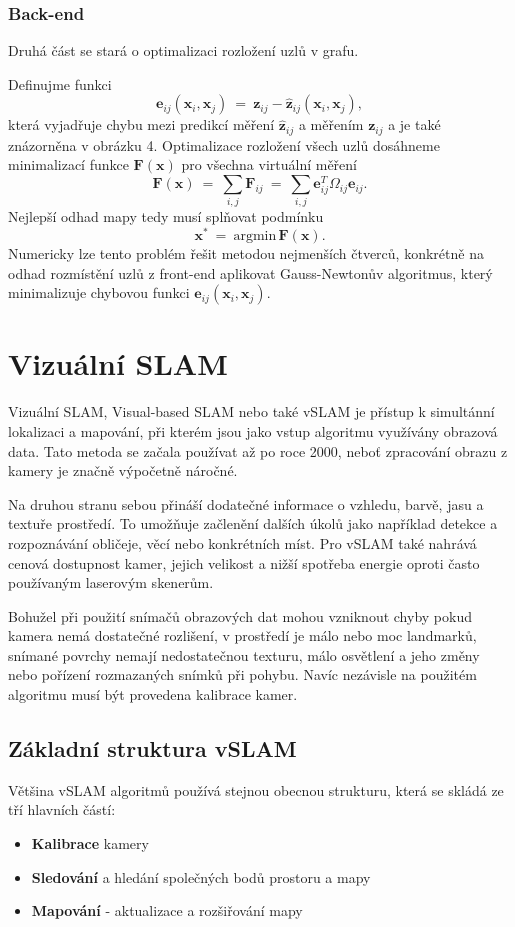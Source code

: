 \documentclass[12pt,a4paper]{article}
\begin{document}
\subsubsection{Back-end}
Druhá část se stará o optimalizaci rozložení uzlů v grafu.

Definujme funkci 
$$
\textbf{e}_{ij}(\textbf{x}_i, \textbf{x}_j) \: = \: \textbf{z}_{ij}-\hat{\textbf{z}}_{ij}(\textbf{x}_i, \textbf{x}_j),
$$
která vyjadřuje chybu mezi predikcí měření $\hat{\textbf{z}}_{ij}$ a měřením $\textbf{z}_{ij}$ a je také znázorněna v obrázku 4. Optimalizace rozložení všech uzlů dosáhneme minimalizací funkce $\textbf{F}(\textbf{x})$ pro všechna virtuální měření
$$
\textbf{F}(\textbf{x}) \: = \: \sum\limits_{i,j} \textbf{F}_{ij} \: = \: \sum\limits_{i,j} \textbf{e}_{ij}^T \Omega_{ij} \textbf{e}_{ij}.
$$
Nejlepší odhad mapy tedy musí splňovat podmínku
$$
\textbf{x}^* \: = \: \text{argmin}\, \textbf{F}(\textbf{x}).
$$
Numericky lze tento problém řešit metodou nejmenších čtverců, konkrétně na odhad rozmístění uzlů z front-end aplikovat Gauss-Newtonův algoritmus, který minimalizuje chybovou funkci $\textbf{e}_{ij}(\textbf{x}_i, \textbf{x}_j)$.


\section{Vizuální SLAM}
Vizuální SLAM, Visual-based SLAM nebo také vSLAM je přístup k simultánní lokalizaci a mapování, při kterém jsou jako vstup algoritmu využívány obrazová data. Tato metoda se začala používat až po roce 2000, neboť zpracování obrazu z kamery je značně výpočetně náročné. 

Na druhou stranu sebou přináší dodatečné informace o vzhledu, barvě, jasu a textuře prostředí. To umožňuje začlenění dalších úkolů jako například detekce a rozpoznávání obličeje, věcí nebo konkrétních míst. Pro vSLAM také nahrává cenová dostupnost kamer, jejich velikost a nižší spotřeba energie oproti často používaným laserovým skenerům. 

Bohužel při použití snímačů obrazových dat mohou vzniknout chyby pokud kamera nemá dostatečné rozlišení, v prostředí je málo nebo moc landmarků, snímané povrchy nemají nedostatečnou texturu, málo osvětlení a jeho změny nebo pořízení rozmazaných snímků při pohybu. Navíc nezávisle na použitém algoritmu musí být provedena kalibrace kamer.

\subsection{Základní struktura vSLAM}
Většina vSLAM algoritmů používá stejnou obecnou strukturu, která se skládá ze tří hlavních částí:
\begin{itemize}
\item \textbf{Kalibrace} kamery 
\item \textbf{Sledování} a hledání společných bodů prostoru a mapy
\item \textbf{Mapování} - aktualizace a rozšiřování mapy
\end{itemize}
\end{document}
